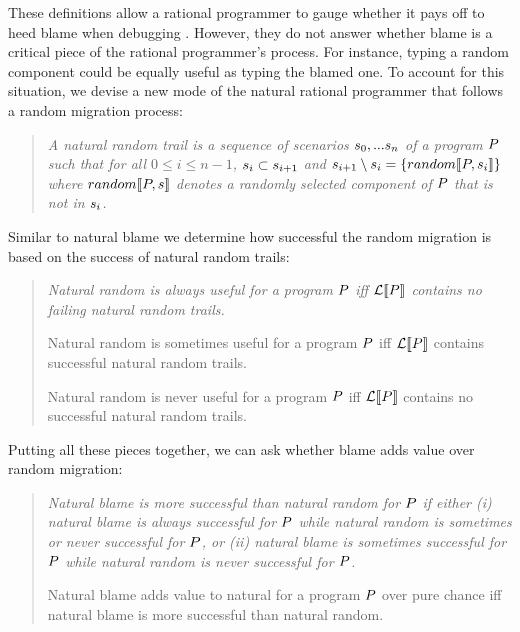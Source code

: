These definitions allow a rational programmer to gauge whether it pays off to heed blame
when debugging \system. 
However, they do not answer whether blame is a critical piece of 
the rational programmer's process.  For instance, 
typing a random component   could be equally useful as typing the blamed one. 
To account for this situation, we devise a new
mode of the natural rational programmer that 
 follows a random migration process:
\begin{quote}
\it 
A natural random trail
is a sequence of scenarios $s_0,...s_n$ of a program
$P$  such that for all $0 \leq i \leq n - 1$, $s_i \subset s_{i+1}$ and
$s_{i+1} \setminus s_i = \{random\llbracket P, s_i\rrbracket\}$
where $random\llbracket P, s\rrbracket$ denotes a randomly selected component of $P$
that is not in $s_i$.
\end{quote}
\indent
Similar to natural blame we determine how successful the random
migration is based on the success of natural random trails: 
\begin{quote}
\it
  Natural random is always useful for a program $P$ iff 
  $\mathcal{L}\llbracket P\rrbracket$ contains no failing natural random trails.

   Natural random is sometimes useful for a program $P$ iff 
  $\mathcal{L}\llbracket P\rrbracket$ contains successful natural random trails.

   Natural random is never useful for a program $P$ iff 
  $\mathcal{L}\llbracket P\rrbracket$ contains no successful natural random trails.

\end{quote}

Putting all these pieces together, we can ask whether 
blame adds value over random migration: 
\begin{quote}
\it
  Natural blame is more successful than natural random for $P$ if 
  either (i) natural blame is always successful for $P$ while natural random 
  is sometimes or never successful for $P$, or (ii) 
  natural blame is sometimes successful for $P$ while natural random 
  is never successful for $P$.

  Natural blame adds value to natural for a program $P$ over pure chance iff 
  natural blame is more successful than natural random.
\end{quote}

